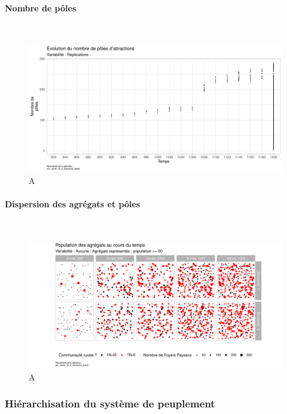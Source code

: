 \paragraph{Nombre de pôles}~\\

\begin{figure}[H]
	\centering
	\includegraphics[width=\linewidth]{img/results_6_6/Poles_Nb_Haut.pdf}
	\caption{A}
	\label{}
\end{figure}

\paragraph{Dispersion des agrégats et pôles}~\\

\begin{figure}[H]
	\centering
	\includegraphics[width=\linewidth]{img/results_6_6/Agregats_Carte_Haut.pdf}
	\caption{A}
	\label{}
\end{figure}


\subsubsection{Hiérarchisation du système de peuplement}

